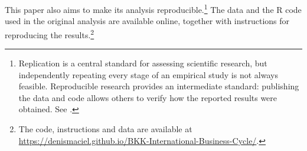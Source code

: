 This paper also aims to make its analysis reproducible.\footnote{Replication is a central standard for assessing scientific research, but independently repeating every stage of an empirical study is not always feasible. Reproducible research provides an intermediate standard: publishing the data and code allows others to verify how the reported results were obtained. See \cite{Peng:2011aa}.} The data and the R code used in the original analysis are available online, together with instructions for reproducing the results.\footnote{The code, instructions and data are available at \url{https://denismaciel.github.io/BKK-International-Business-Cycle/}.}